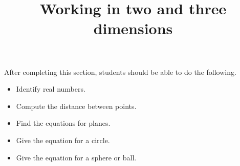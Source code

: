 \documentclass{ximera}
\title{Working in two and three dimensions}
\begin{document}
\begin{abstract}
\end{abstract}

\maketitle

\begin{sectionOutcomes}

After completing this section, students should be able to do the following.

\begin{itemize}
\item Identify real numbers.
\item Compute the distance between points.
\item Find the equations for planes.
\item Give the equation for a circle.
\item Give the equation for a sphere or ball.
\end{itemize}

\end{sectionOutcomes}
\end{document}
